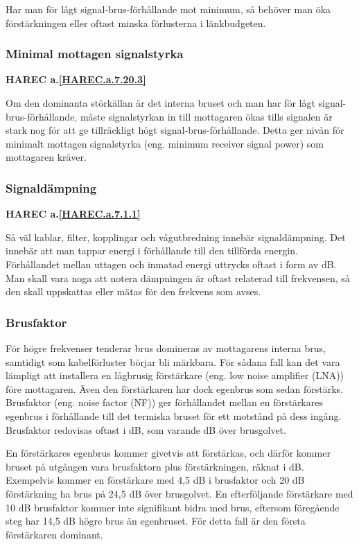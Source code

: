 Har man för lågt signal-brus-förhållande mot minimum, så behöver man öka
förstärkningen eller oftast minska förlusterna i länkbudgeten.

\subsubsection{Minimal mottagen signalstyrka}
\textbf{HAREC a.\ref{HAREC.a.7.20.3}\label{myHAREC.a.7.20.3}}

Om den dominanta störkällan är det interna bruset och man har för lågt
signal-brus-förhållande, måste signalstyrkan in till mottagaren ökas
tills signalen är stark nog för att ge tillräckligt högt
signal-brus-förhållande.
Detta ger nivån för minimalt mottagen signalstyrka (eng. minimum receiver
signal power) som mottagaren kräver.

\subsubsection{Signaldämpning}
\textbf{HAREC a.\ref{HAREC.a.7.1.1}\label{myHAREC.a.7.1.1}}

Så väl kablar, filter, kopplingar och vågutbredning innebär signaldämpning.
Det innebär att man tappar energi i förhållande till den tillförda energin.
Förhållandet mellan uttagen och inmatad energi uttrycks oftast i form av dB.
Man skall vara noga att notera dämpningen är oftast relaterad till frekvensen,
så den skall uppskattas eller mätas för den frekvens som avses.

\subsubsection{Brusfaktor}
\label{brusfaktor}

För högre frekvenser tenderar brus domineras av mottagarens interna brus,
samtidigt som kabelförluster börjar bli märkbara.
För sådana fall kan det vara lämpligt att installera en lågbrusig förstärkare
(eng. low noise amplifier (LNA)) före mottagaren.
Även den förstärkaren har dock egenbrus som sedan förstärks.
Brusfaktor (eng. noise factor (NF)) ger förhållandet mellan en förstärkares
egenbrus i förhållande till det termiska bruset för ett motstånd på dess
ingång. Brusfaktor redovisas oftast i dB, som varande dB över brusgolvet.

En förstärkares egenbrus kommer givetvis att förstärkas, och därför kommer
bruset på utgången vara brusfaktorn plus förstärkningen, räknat i dB.
Exempelvis kommer en förstärkare med 4,5 dB i brusfaktor och 20 dB förstärkning
ha brus på 24,5 dB över brusgolvet.
En efterföljande förstärkare med 10 dB brusfaktor kommer inte signifikant
bidra med brus, eftersom föregående steg har 14,5 dB högre brus än egenbruset.
För detta fall är den första förstärkaren dominant.

